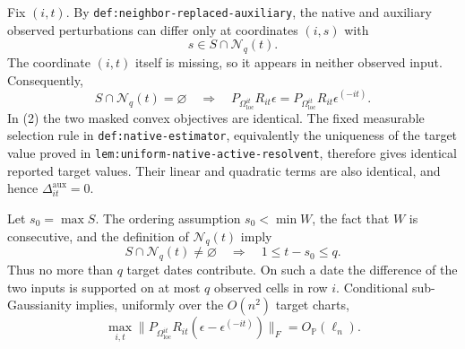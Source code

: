Fix \((i,t)\).  By \texttt{def:neighbor-replaced-auxiliary}, the native and auxiliary observed perturbations can differ only at coordinates \((i,s)\) with
\[
 s\in S\cap\mathcal N_q(t).
 \tag{1}
\]
The coordinate \((i,t)\) itself is missing, so it appears in neither observed input.  Consequently,
\[
 S\cap\mathcal N_q(t)=\varnothing
 \quad\Longrightarrow\quad
 P_{\Omega_{\mathrm{loc}}^{it}}R_{it}\epsilon
 =P_{\Omega_{\mathrm{loc}}^{it}}R_{it}\epsilon^{(-it)}.
 \tag{2}
\]
In (2) the two masked convex objectives are identical.  The fixed measurable selection rule in \texttt{def:native-estimator}, equivalently the uniqueness of the target value proved in \texttt{lem:uniform-native-active-resolvent}, therefore gives identical reported target values.  Their linear and quadratic terms are also identical, and hence \(\Delta^{\mathrm{aux}}_{it}=0\).

Let \(s_0=\max S\).  The ordering assumption \(s_0<\min W\), the fact that \(W\) is consecutive, and the definition of \(\mathcal N_q(t)\) imply
\[
 S\cap\mathcal N_q(t)\ne\varnothing
 \quad\Longrightarrow\quad
 1\le t-s_0\le q.
 \tag{3}
\]
Thus no more than \(q\) target dates contribute.  On such a date the difference of the two inputs is supported on at most \(q\) observed cells in row \(i\).  Conditional sub-Gaussianity implies, uniformly over the \(O(n^2)\) target charts,
\[
 \max_{i,t}\|P_{\Omega_{\mathrm{loc}}^{it}}R_{it}
 (\epsilon-\epsilon^{(-it)})\|_F=O_{\mathbb P}(\ell_n).
 \tag{4}
\]

